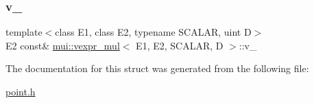 \subsubsection{\texorpdfstring{v\+\_\+}{v\_}}
{\footnotesize\ttfamily template$<$class E1, class E2, typename S\+C\+A\+L\+AR, uint D$>$ \\
E2 const\& \hyperlink{structmui_1_1vexpr__mul}{mui\+::vexpr\+\_\+mul}$<$ E1, E2, S\+C\+A\+L\+AR, D $>$\+::v\+\_\+\hspace{0.3cm}{\ttfamily [protected]}}



The documentation for this struct was generated from the following file\+:\begin{DoxyCompactItemize}
\item 
\hyperlink{point_8h}{point.\+h}\end{DoxyCompactItemize}
